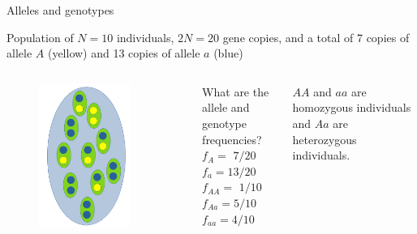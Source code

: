 \begin{frame}{Alleles and genotypes}

	\bigskip
	\small
	Population of $N=10$ individuals, $2N=20$ gene copies, and a total of 7 copies of allele $A$ 
	(yellow) and 13 copies of allele $a$ (blue)

 	\begin{columns}


                \begin{figure}
                        \includegraphics[width=0.8\textwidth]{Pics/population}
                \end{figure}


		What are the allele and genotype frequencies? \\
		\pause
		$f_A=$ \pause $7/20$ \\
		$f_a=13/20$ \\
		\vskip 0.5cm
		$f_{AA}=$ \pause $1/10$ \\
		$f_{Aa}=5/10$ \\
		$f_{aa}=4/10$ 
		
		\vskip 0.2cm
		$AA$ and $aa$ are homozygous individuals and $Aa$ are heterozygous individuals.

        \end{columns}

\end{frame}


